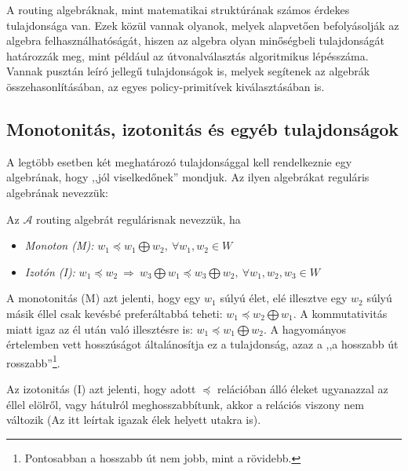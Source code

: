   A routing algebráknak, mint matematikai struktúrának számos érdekes tulajdonsága van. Ezek közül vannak olyanok, melyek alapvetően befolyásolják az algebra felhasználhatóságát, hiszen az algebra olyan minőségbeli tulajdonságát határozzák meg, mint például az útvonalválasztás algoritmikus lépésszáma. Vannak pusztán leíró jellegű tulajdonságok is, melyek segítenek az algebrák összehasonlításában, az egyes policy-primitívek kiválasztásában is.

    \subsection{Monotonitás, izotonitás és egyéb tulajdonságok}\label{jol_viselkedo}

    A legtöbb esetben két meghatározó tulajdonsággal kell rendelkeznie egy algebrának, hogy ,,jól viselkedőnek'' mondjuk. Az ilyen algebrákat reguláris algebrának nevezzük:

    \begin{definition} 
      Az $\mathcal{A}$ routing algebrát regulárisnak nevezzük, ha
      \begin{itemize}
      \item \emph{ Monoton (M):} $w_{1} \preceq w_{1} \bigoplus w_{2}, ~\forall w_{1}, w_{2} \in W$
      \item \emph{ Izotón (I):} $w_{1} \preceq w_{2}~\Rightarrow~w_{3} \bigoplus w_{1} \preceq w_{3} \bigoplus w_{2},~\forall w_{1}, w_{2}, w_{3} \in W$
      \end{itemize}
    \end{definition}

    A monotonitás (M) azt jelenti, hogy egy $w_1$ súlyú élet, elé illesztve egy $w_2$ súlyú másik éllel csak kevésbé preferáltabbá teheti: $w_{1} \preceq w_{2} \bigoplus w_{1}$. A kommutativitás miatt igaz az él után való illesztésre is: $w_{1} \preceq w_{1} \bigoplus w_{2}$. A hagyományos értelemben vett hosszúságot általánosítja ez a tulajdonság, azaz a ,,a hosszabb út rosszabb''\footnote{Pontosabban a hosszabb út nem jobb, mint a rövidebb.}.

    Az izotonitás (I) azt jelenti, hogy adott $\preceq$ relációban álló éleket ugyanazzal az éllel elölről, vagy hátulról meghosszabbítunk, akkor a relációs viszony nem változik (Az itt leírtak igazak élek helyett utakra is).\\

